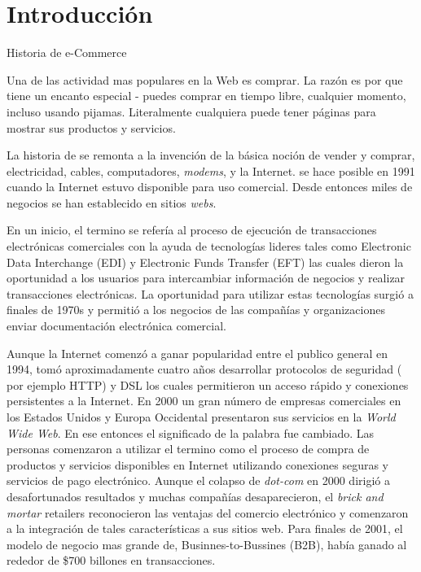 \chapter{Introducción}\label{cap:intro}

Historia de e-Commerce

Una de las actividad mas populares en la Web es comprar. La razón es por que tiene un encanto especial - puedes comprar en tiempo libre, cualquier momento, incluso usando pijamas. Literalmente cualquiera puede tener páginas para mostrar sus productos y servicios.

La historia de  se remonta a la invención de la básica noción de \“vender y comprar\”, electricidad, cables, computadores, \textit{modems}, y la Internet.  se hace posible en 1991 cuando la Internet estuvo disponible para uso comercial. Desde entonces miles de negocios se han establecido en sitios \textit{webs}.

En un inicio, el termino  se refería al proceso de ejecución  de transacciones electrónicas comerciales con la ayuda de tecnologías lideres tales como Electronic Data Interchange (EDI) y Electronic Funds Transfer (EFT) las cuales dieron la oportunidad a los usuarios para intercambiar información de negocios y realizar transacciones electrónicas. La oportunidad para utilizar estas tecnologías surgió a finales de 1970s y permitió a los negocios de las compañías y organizaciones enviar documentación electrónica comercial.

Aunque la Internet comenzó a ganar popularidad  entre el publico general en 1994, tomó aproximadamente cuatro años desarrollar protocolos de seguridad ( por ejemplo HTTP) y DSL los cuales permitieron un acceso rápido y conexiones persistentes a la Internet. En 2000 un gran número de empresas comerciales en los Estados Unidos y Europa Occidental presentaron sus servicios en la \textit{World Wide Web}. En ese entonces el significado de la palabra  fue cambiado. Las personas comenzaron a utilizar el termino  como el proceso de compra de productos y servicios disponibles en Internet utilizando conexiones seguras y servicios de pago electrónico. Aunque el colapso de \textit{dot-com} en 2000 dirigió a desafortunados resultados y muchas compañías  desaparecieron, el \textit{brick and mortar} retailers reconocieron las ventajas del comercio electrónico y comenzaron a la integración de tales características a sus sitios web. Para finales de 2001, el modelo de negocio mas grande de, Businnes-to-Bussines (B2B), había ganado al rededor de \$700 billones en transacciones.

